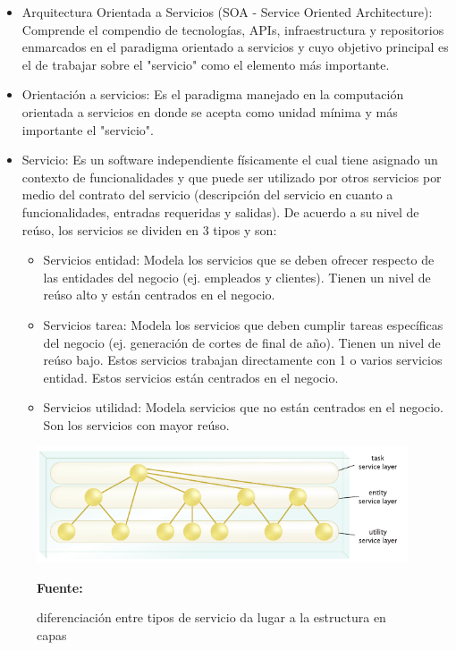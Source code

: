 \begin{itemize}
  \item Arquitectura Orientada a Servicios (SOA - Service Oriented Architecture): Comprende el compendio de tecnologías, APIs, infraestructura y repositorios enmarcados en el paradigma orientado a servicios y cuyo objetivo principal es el de trabajar sobre el "servicio" como el elemento más importante.
  \item Orientación a servicios: Es el paradigma manejado en la computación orientada a servicios en donde se acepta como unidad mínima y más importante el "servicio".
  \item Servicio: Es un software independiente físicamente el cual tiene asignado un contexto de funcionalidades y que puede ser utilizado por otros servicios por medio del contrato del servicio (descripción del servicio en cuanto a funcionalidades, entradas requeridas y salidas). De acuerdo a su nivel de reúso, los servicios se dividen en 3 tipos y son:
  \begin{itemize}
    \item Servicios entidad: Modela los servicios que se deben ofrecer respecto de las entidades del negocio (ej. empleados y clientes). Tienen un nivel de reúso alto y están centrados en el negocio.
    \item Servicios tarea: Modela los servicios que deben cumplir tareas específicas del negocio (ej. generación de cortes de final de año). Tienen un nivel de reúso bajo. Estos servicios trabajan directamente con 1 o varios servicios entidad. Estos servicios están centrados en el negocio.
    \item Servicios utilidad: Modela servicios que no están centrados en el negocio. Son los servicios con mayor reúso.
  \end{itemize}
\end{itemize}

\begin{figure}[!htb]
  \begin{center}
    \includegraphics[width=11cm]{./imagenes/5.png}
    \caption{diferenciación entre tipos de servicio da lugar a la estructura en capas}
    \label{fig:cinco}
    \textbf{Fuente:}  \cite{soa_principles}
  \end{center}
\end{figure}

